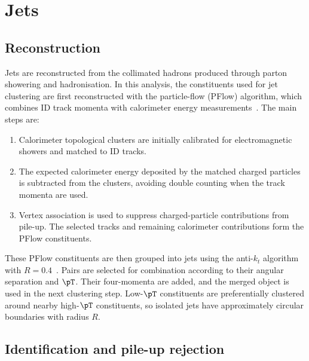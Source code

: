 \section{Jets}
\label{sec:ch6_jets}

\subsection{Reconstruction}

Jets are reconstructed from the collimated hadrons produced through parton showering and hadronisation.
In this analysis, the constituents used for jet clustering are first reconstructed with the particle-flow (PFlow) algorithm, which combines ID track momenta with calorimeter energy measurements~\cite{ATLAS2017ParticleFlow}.
The main steps are:
\begin{enumerate}
    \item Calorimeter topological clusters are initially calibrated for electromagnetic showers and matched to ID tracks.
    \item The expected calorimeter energy deposited by the matched charged particles is subtracted from the clusters, avoiding double counting when the track momenta are used.
    \item Vertex association is used to suppress charged-particle contributions from pile-up. The selected tracks and remaining calorimeter contributions form the PFlow constituents.
\end{enumerate}

These PFlow constituents are then grouped into jets using the anti-$k_t$ algorithm with $R=0.4$~\cite{Cacciari2008AntiKt}.
Pairs are selected for combination according to their angular separation and $\pT$.
Their four-momenta are added, and the merged object is used in the next clustering step.
Low-$\pT$ constituents are preferentially clustered around nearby high-$\pT$ constituents, so isolated jets have approximately circular boundaries with radius $R$.

\subsection{Identification and pile-up rejection}

